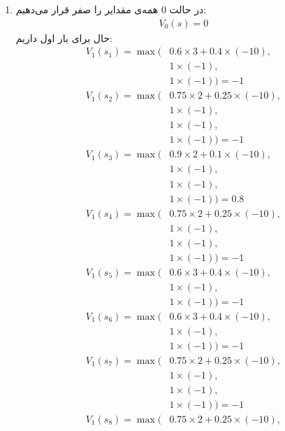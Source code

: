 \begin{enumerate}
    \item در حالت 0 همه‌ی مقدایر را صفر قرار می‌دهیم:
    \begin{gather*}
        V_0(s) = 0
    \end{gather*}
    حال برای بار اول داریم:
    \begin{align*}
        V_1(s_1) = \max(
            &0.6 \times 3 + 0.4 \times (-10),\\
            &1 \times (-1),\\
            &1 \times (-1)
        ) = -1\\
        V_1(s_2) = \max(
            &0.75 \times 2 + 0.25 \times (-10),\\
            &1 \times (-1),\\
            &1 \times (-1),\\
            &1 \times (-1)
        ) = -1\\
        V_1(s_3) = \max(
            &0.9 \times 2 + 0.1 \times (-10),\\
            &1 \times (-1),\\
            &1 \times (-1),\\
            &1 \times (-1)
        ) = 0.8\\
        V_1(s_4) = \max(
            &0.75 \times 2 + 0.25 \times (-10),\\
            &1 \times (-1),\\
            &1 \times (-1),\\
            &1 \times (-1)
        ) = -1\\
        V_1(s_5) = \max(
            &0.6 \times 3 + 0.4 \times (-10),\\
            &1 \times (-1),\\
            &1 \times (-1)
        ) = -1\\
        V_1(s_6) = \max(
            &0.6 \times 3 + 0.4 \times (-10),\\
            &1 \times (-1),\\
            &1 \times (-1)
        ) = -1\\
        V_1(s_7) = \max(
            &0.75 \times 2 + 0.25 \times (-10),\\
            &1 \times (-1),\\
            &1 \times (-1),\\
            &1 \times (-1)
        ) = -1\\
        V_1(s_8) = \max(
            &0.75 \times 2 + 0.25 \times (-10),\\

\end{align*}
\end{enumerate}
